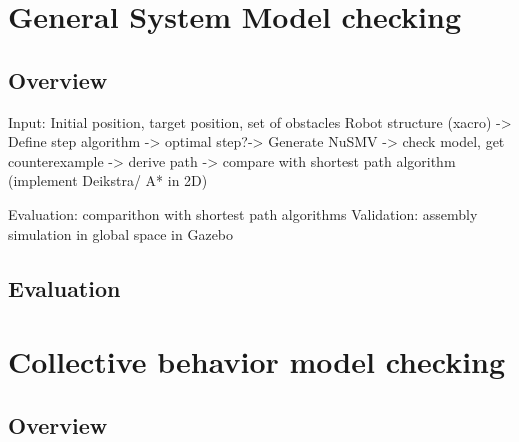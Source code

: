 


\section{General System Model checking }

\subsection{Overview}
Input: Initial position, target position, set of obstacles
Robot structure (xacro) -> Define step algorithm -> optimal step?-> Generate NuSMV -> check model, get counterexample -> 
derive path -> compare with shortest path algorithm (implement Deikstra/ A* in 2D)

Evaluation: comparithon with shortest path algorithms
Validation: assembly simulation in global space in Gazebo
\subsection{Evaluation}

\section{Collective behavior model checking}

\subsection{Overview}


